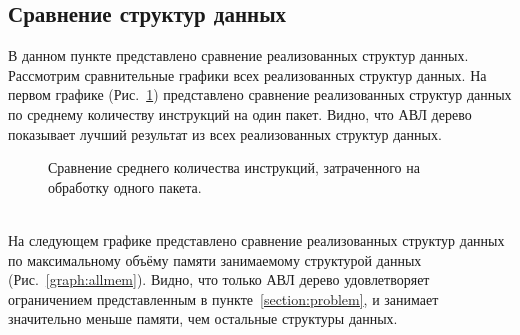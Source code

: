\documentclass[conference]{IEEEtran}
\begin{document}
        \subsection{Сравнение структур данных}
            В данном пункте представлено сравнение реализованных структур данных. Рассмотрим сравнительные графики всех реализованных структур данных.
            На первом графике (Рис.~\ref{graph:allinst}) представлено сравнение реализованных структур данных по среднему количеству инструкций на один пакет. Видно, что АВЛ дерево показывает лучший результат
            из всех реализованных структур данных.
            \\
            \begin{figure}[ht]
                \centering
                \captionsetup{justification=centering}
                \caption{Сравнение среднего количества инструкций, затраченного на обработку одного пакета.}
                \label{graph:allinst}
            \end{figure}
            \\
            На следующем графике представлено сравнение реализованных структур данных по максимальному объёму памяти занимаемому структурой данных (Рис.~\ref{graph:allmem}). Видно, что только АВЛ дерево удовлетворяет
            ограничением представленным в пункте~\ref{section:problem}, и занимает значительно меньше памяти, чем остальные структуры данных.
            \\
\end{document}
